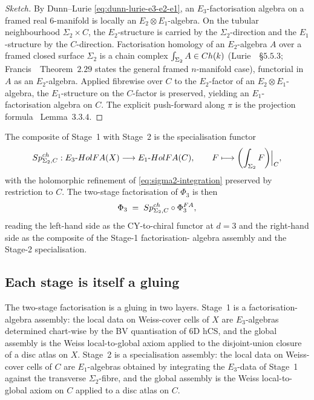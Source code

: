\begin{proof}[Sketch]
By Dunn--Lurie \eqref{eq:dunn-lurie-e3-e2-e1}, an
$E_3$-factorisation algebra on a framed real $6$-manifold is locally an
$E_2 \otimes E_1$-algebra. On the tubular neighbourhood $\Sigma_2
\times C$, the $E_2$-structure is carried by the $\Sigma_2$-direction
and the $E_1$-structure by the $C$-direction. Factorisation homology
of an $E_2$-algebra $A$ over a framed closed surface $\Sigma_2$ is a
chain complex $\int_{\Sigma_2} A \in Ch(k)$
(Lurie~\cite{LurieHA}~\S$5.5.3$; Francis~\cite{Francis2013}~Theorem~$2.29$
states the general framed $n$-manifold case), functorial in $A$ as an
$E_2$-algebra. Applied fibrewise over $C$ to the $E_2$-factor of an
$E_2 \otimes E_1$-algebra, the $E_1$-structure on the $C$-factor is
preserved, yielding an $E_1$-factorisation algebra on $C$. The
explicit push-forward along $\pi$ is the projection formula
\cite{FrancisGaitsgory2012}~Lemma~$3.3.4$.
\end{proof}

The composite of Stage~1 with Stage~2 is the specialisation functor
\begin{equation}
\label{eq:spch-definition}
  Sp^{ch}_{\Sigma_2, C} : E_3\text{-}HolFA(X) \longrightarrow
  E_1\text{-}HolFA(C),
  \qquad
  F \longmapsto \biggl(\int_{\Sigma_2} F\biggr) \Bigr|_{C},
\end{equation}
with the holomorphic refinement of \eqref{eq:sigma2-integration}
preserved by restriction to $C$. The two-stage factorisation of
$\Phi_3$ is then
\begin{equation}
\label{eq:phi3-two-stage}
  \Phi_3 \;=\; Sp^{ch}_{\Sigma_2, C} \circ \Phi^{FA}_3,
\end{equation}
reading the left-hand side as the CY-to-chiral functor at $d = 3$ and
the right-hand side as the composite of the Stage-1 factorisation-
algebra assembly and the Stage-2 specialisation.

\subsection{Each stage is itself a gluing}
\label{subsec:fa-each-stage-gluing}

The two-stage factorisation is a gluing in two layers. Stage~1 is
a factorisation-algebra assembly: the local data on Weiss-cover cells
of $X$ are $E_3$-algebras determined chart-wise by the BV quantisation
of 6D hCS, and the global assembly is the Weiss local-to-global axiom
applied to the disjoint-union closure of a disc atlas on $X$. Stage~2
is a specialisation assembly: the local data on Weiss-cover cells of
$C$ are $E_1$-algebras obtained by integrating the $E_3$-data of
Stage~1 against the transverse $\Sigma_2$-fibre, and the global
assembly is the Weiss local-to-global axiom on $C$ applied to a disc
atlas on $C$.

